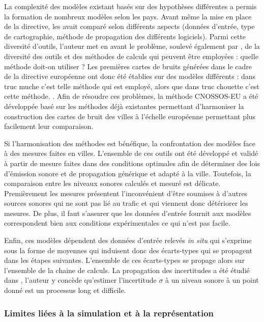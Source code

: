 La complexité des modèles existant basés sur des hypothèses différentes a permis la formation de nombreux modèles selon les pays. Avant même la mise en place de la directive, \cite{steele_critical_2001} les avait comparé selon différents aspects (données d'entrée, type de cartographie, méthode de propagation des différents logiciels). Parmi cette diversité d'outils, l'auteur met en avant le problème, soulevé également par \cite{king_implementation_2011}, de la diversité des outils et des méthodes de calculs qui peuvent être employées : quelle méthode doit-on utiliser ? Les premières cartes de bruits générées dans le cadre de la directive européenne ont donc été établies sur des modèles différents : dans truc muche c'est telle méthode qui est employé, alors que dans truc chouette c'est cette méthode.  \cite{murphy_environmental_2006, murphy_estimating_2009}.
Afin de résoudre ces problèmes, la méthode CNOSSOS-EU \cite{CNOSSOS,kephalopoulos} a été développée basé sur les méthodes déjà existantes permettant d'harmoniser la construction des cartes de bruit des villes à l'échelle européenne permettant plus facilement leur comparaison. 

Si l'harmonisation des méthodes est bénéfique, la confrontation des modèles face à des mesures faites en villes. L'ensemble de ces outils ont été développé et validé à partir de mesure faites dans des conditions optimales afin de déterminer des lois d'émission sonore et de propagation générique et adapté à la ville. Toutefois, la comparaison entre les niveaux sonores calculés et mesuré est délicate. Premièrement les mesures présentent l'inconvénient d'être soumises à d'autres sources sonores qui ne sont pas lié au trafic et qui viennent donc détériorer les mesures. De plus, il faut s'assurer que les données d'entrée fournit aux modèles correspondent bien aux conditions expérimentales ce qui n'est pas facile.

Enfin, ces modèles dépendent des données d'entrée relevés \textit{in situ} qui s'exprime sous la forme de moyennes qui induisent donc des écarts-types qui se propagent dans les étapes suivantes. L'ensemble de ces écarts-types se propage alors sur l'ensemble de la chaine de calculs. La propagation des incertitudes a été étudié dans \cite{probst2005uncertainties}, l'auteur y concède qu'estimer l'incertitude $\sigma$ à un niveau sonore à un point donné est un processus long et difficile.

\subsubsection{Limites liées à la simulation et à la représentation}


